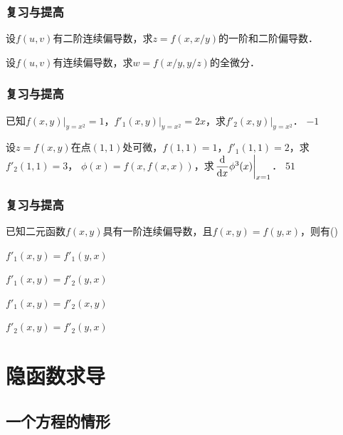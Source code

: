 \documentclass[14pt,notheorems,leqno,xcolor={rgb}]{beamer} %
\begin{document}
\begin{frame}
\frametitle{复习与提高}
\begin{puzzle}
设$f(u,v)$有二阶连续偏导数，求$z=f(x,x/y)$的一阶和二阶偏导数．
\end{puzzle}
\vpause
\begin{puzzle}
设$f(u,v)$有连续偏导数，求$w=f(x/y,y/z)$的全微分．
\end{puzzle}
\end{frame}

\begin{frame}
\frametitle{复习与提高}
\begin{puzzle}
已知$f(x,y)|_{y=x^2}=1$，$f'_1(x,y)|_{y=x^2}=2x$，求$f'_2(x,y)|_{y=x^2}$．
\pause\cdotfill$-1$
\end{puzzle}
\vpause
\begin{puzzle}%
设$z=f(x,y)$在点$(1,1)$处可微，$f(1,1)=1$，$f'_1(1,1)=2$，求$f'_2(1,1)=3$，
$\phi(x)=f(x,f(x,x))$，求$\left.\dfrac{\mathop{}\!\mathrm{d}}{\mathop{}\!\mathrm{d} x}\phi^3(x)\right|_{x=1}$．
\pause\cdotfill$51$
\end{puzzle}
\end{frame}

\begin{frame}
\frametitle{复习与提高}
\begin{choice}
已知二元函数$f(x,y)$具有一阶连续偏导数，且$f(x,y)=f(y,x)$，则有\dotfill()
\begin{choicehalf}
  \item $f'_1(x,y)=f'_1(y,x)$ ~
  \item $f'_1(x,y)=f'_2(y,x)$ ~
  \item $f'_1(x,y)=f'_2(x,y)$ ~
  \item $f'_2(x,y)=f'_2(y,x)$ ~
\end{choicehalf} 
\end{choice}
\end{frame}

\section{隐函数求导}

\subsection{一个方程的情形}
\end{document}
